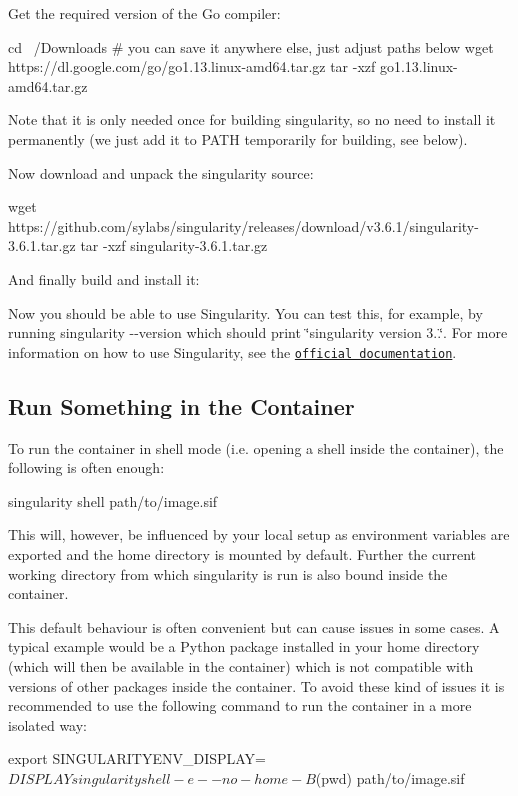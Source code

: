 Get the required version of the Go compiler\+: \begin{DoxyVerb}cd ~/Downloads  # you can save it anywhere else, just adjust paths below
wget https://dl.google.com/go/go1.13.linux-amd64.tar.gz
tar -xzf go1.13.linux-amd64.tar.gz
\end{DoxyVerb}


Note that it is only needed once for building singularity, so no need to install it permanently (we just add it to P\+A\+TH temporarily for building, see below).

Now download and unpack the singularity source\+: \begin{DoxyVerb}wget https://github.com/sylabs/singularity/releases/download/v3.6.1/singularity-3.6.1.tar.gz
tar -xzf singularity-3.6.1.tar.gz
\end{DoxyVerb}


And finally build and install it\+: 


Now you should be able to use Singularity. You can test this, for example, by running {\ttfamily singularity -\/-\/version} which should print \char`\"{}singularity version 3..\char`\"{}. For more information on how to use Singularity, see the \href{https://sylabs.io/guides/3.6/user-guide/index.html}{\tt official documentation}.

\subsection*{Run Something in the Container }

To run the container in shell mode (i.\+e. opening a shell inside the container), the following is often enough\+: \begin{DoxyVerb}singularity shell path/to/image.sif
\end{DoxyVerb}


This will, however, be influenced by your local setup as environment variables are exported and the home directory is mounted by default. Further the current working directory from which singularity is run is also bound inside the container.

This default behaviour is often convenient but can cause issues in some cases. A typical example would be a Python package installed in your home directory (which will then be available in the container) which is not compatible with versions of other packages inside the container. To avoid these kind of issues it is recommended to use the following command to run the container in a more isolated way\+: \begin{DoxyVerb}export SINGULARITYENV_DISPLAY=$DISPLAY
singularity shell -e --no-home -B $(pwd) path/to/image.sif
\end{DoxyVerb}


